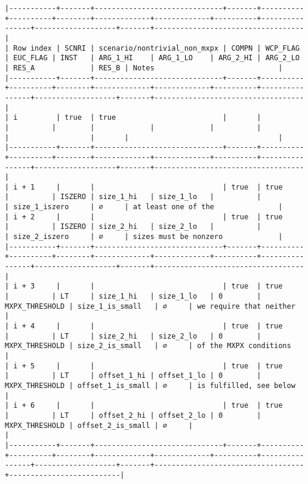 \documentclass[varwidth=\maxdimen,margin=0.5cm,multi={verbatim}]{standalone}
\begin{document}
\begin{verbatim}
|-----------+-------+------------------------------+-------+----------+----------+--------+-------------+-------------+----------+----------------+-------------------+-------+-----------------------------------|
| Row index | SCNRI | scenario/nontrivial_non_mxpx | COMPN | WCP_FLAG | EUC_FLAG | INST   | ARG_1_HI    | ARG_1_LO    | ARG_2_HI | ARG_2_LO       | RES_A             | RES_B | Notes                             |
|-----------+-------+------------------------------+-------+----------+----------+--------+-------------+-------------+----------+----------------+-------------------+-------+-----------------------------------|
| i         | true  | true                         |       |          |          |        |             |             |          |                |                   |       |                                   |
|-----------+-------+------------------------------+-------+----------+----------+--------+-------------+-------------+----------+----------------+-------------------+-------+-----------------------------------|
| i + 1     |       |                              | true  | true     |          | ISZERO | size_1_hi   | size_1_lo   |          |                | size_1_iszero     | ∅     | at least one of the               |
| i + 2     |       |                              | true  | true     |          | ISZERO | size_2_hi   | size_2_lo   |          |                | size_2_iszero     | ∅     | sizes must be nonzero             |
|-----------+-------+------------------------------+-------+----------+----------+--------+-------------+-------------+----------+----------------+-------------------+-------+-----------------------------------|
| i + 3     |       |                              | true  | true     |          | LT     | size_1_hi   | size_1_lo   | 0        | MXPX_THRESHOLD | size_1_is_small   | ∅     | we require that neither           |
| i + 4     |       |                              | true  | true     |          | LT     | size_2_hi   | size_2_lo   | 0        | MXPX_THRESHOLD | size_2_is_small   | ∅     | of the MXPX conditions            |
| i + 5     |       |                              | true  | true     |          | LT     | offset_1_hi | offset_1_lo | 0        | MXPX_THRESHOLD | offset_1_is_small | ∅     | is fulfilled, see below           |
| i + 6     |       |                              | true  | true     |          | LT     | offset_2_hi | offset_2_lo | 0        | MXPX_THRESHOLD | offset_2_is_small | ∅     |                                   |
|-----------+-------+------------------------------+-------+----------+----------+--------+-------------+-------------+----------+----------------+-------------------+-------+-----------------------------------+--------------------------|

\end{verbatim}
\end{document}
